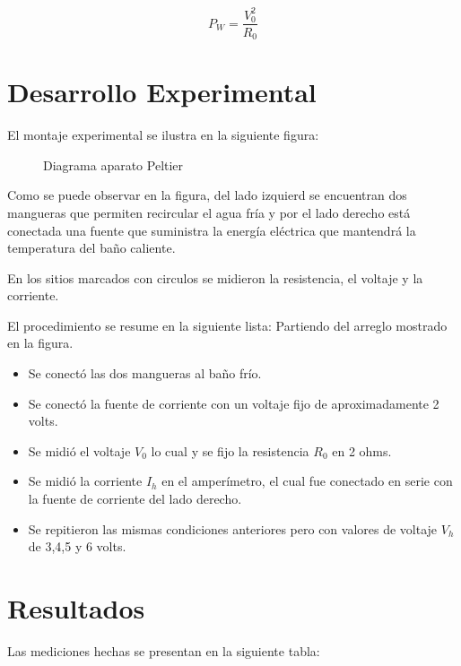 \documentclass[12pt]{article}
\begin{document}
\begin{equation}
P_W = \frac{V_0^2}{R_0}
\end{equation}
\vspace{-0.5cm}
\section{Desarrollo Experimental}
\vspace{-0.5cm}
El montaje experimental se ilustra en la siguiente figura:

\begin{figure}[H]
\begin{center}
\caption{Diagrama aparato Peltier}
\label{one}
\end{center}
\end{figure}

Como se puede observar en la figura, del lado izquierd se encuentran dos mangueras que permiten recircular el agua fría y por el lado derecho está conectada una fuente que suministra la energía eléctrica que mantendrá la temperatura del baño caliente.

En los sitios marcados con circulos se midieron la resistencia, el voltaje y la corriente.

El procedimiento se resume en la siguiente lista:
Partiendo del arreglo mostrado en la figura.
\begin{itemize}
\item Se conectó las dos mangueras al baño frío.
\item Se conectó la fuente de corriente con un voltaje fijo de
aproximadamente 2 volts.
\item Se midió el voltaje $V_0$ lo cual y se fijo la resistencia $R_0$ en 2 ohms.
\item Se midió la corriente $I_h$ en el amperímetro, el cual fue conectado en serie con la fuente de corriente del lado derecho.
\item Se repitieron las mismas condiciones anteriores pero con valores de voltaje $V_h$ de 3,4,5 y 6 volts.
\end{itemize}

\section{Resultados}
Las mediciones hechas se presentan en la siguiente tabla:
\end{document}
